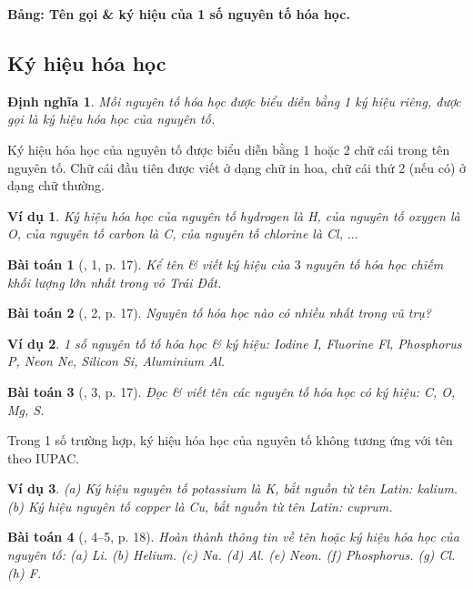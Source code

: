 \documentclass{article}
\newtheorem{baitoan}{Bài toán}
\newtheorem{dinhnghia}{Định nghĩa}
\newtheorem{vidu}{Ví dụ}
\begin{document}
\textbf{Bảng: Tên gọi \& ký hiệu của 1 số nguyên tố hóa học.}

\subsection{Ký hiệu hóa học}

\begin{dinhnghia}
	Mỗi nguyên tố hóa học được biểu diễn bằng 1 ký hiệu riêng, được gọi là \emph{ký hiệu hóa học của nguyên tố}.
\end{dinhnghia}
Ký hiệu hóa học của nguyên tố được biểu diễn bằng 1 hoặc 2 chữ cái trong tên nguyên tố. Chữ cái đầu tiên được viết ở dạng chữ in hoa, chữ cái thứ 2 (nếu có) ở dạng chữ thường.

\begin{vidu}
	Ký hiệu hóa học của nguyên tố hydrogen là \emph{H}, của nguyên tố oxygen là \emph{O}, của nguyên tố carbon là \emph{C}, của nguyên tố chlorine là \emph{Cl}, $\ldots$
\end{vidu}

\begin{baitoan}[\cite{SGK_KHTN_7_Canh_Dieu}, 1, p. 17]
	Kể tên \& viết ký hiệu của $3$ nguyên tố hóa học chiếm khối lượng lớn nhất trong vỏ Trái Đất.
\end{baitoan}

\begin{baitoan}[\cite{SGK_KHTN_7_Canh_Dieu}, 2, p. 17]
	Nguyên tố hóa học nào có nhiều nhất trong vũ trụ?
\end{baitoan}

\begin{vidu}
	1 số nguyên tố tố hóa học \& ký hiệu: Iodine \emph{I}, Fluorine \emph{Fl}, Phosphorus \emph{P}, Neon \emph{Ne}, Silicon \emph{Si}, Aluminium \emph{Al}.
\end{vidu}

\begin{baitoan}[\cite{SGK_KHTN_7_Canh_Dieu}, 3, p. 17]
	Đọc \& viết tên các nguyên tố hóa học có ký hiệu: \emph{C, O, Mg, S}.
\end{baitoan}
Trong 1 số trường hợp, ký hiệu hóa học của nguyên tố không tương ứng với tên theo IUPAC.

\begin{vidu}
	(a) Ký hiệu nguyên tố potassium là \emph{K}, bắt nguồn từ tên Latin: kalium. (b) Ký hiệu nguyên tố copper là \emph{Cu}, bắt nguồn từ tên Latin: cuprum.
\end{vidu}

\begin{baitoan}[\cite{SGK_KHTN_7_Canh_Dieu}, 4--5, p. 18]
	Hoàn thành thông tin về tên hoặc ký hiệu hóa học của nguyên tố: (a) \emph{Li}. (b) Helium. (c) \emph{Na}. (d) \emph{Al}. (e) Neon. (f) Phosphorus. (g) \emph{Cl}. (h) \emph{F}.
\end{baitoan}
\end{document}
